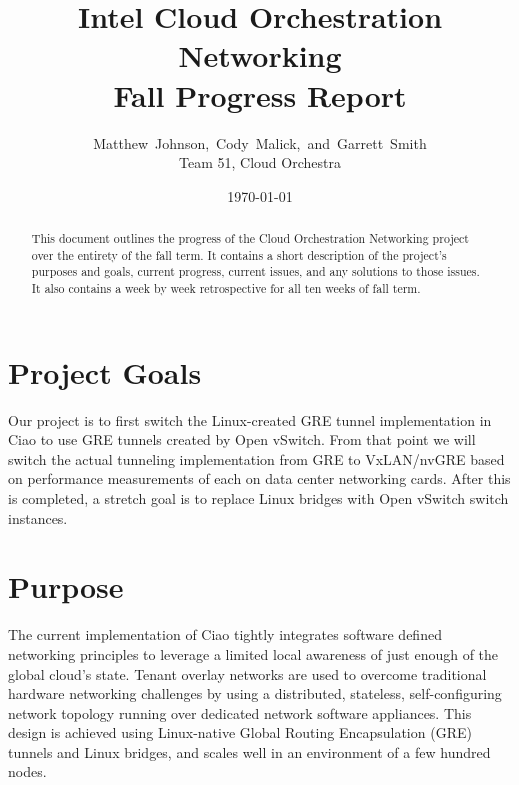 \documentclass[10pt,onecolumn,journal,draftclsnofoot]{IEEEtran}
\begin{document}
\begin{titlepage}
	\title{Intel Cloud Orchestration Networking\\ Fall Progress Report}
	\author{Matthew~Johnson,~Cody~Malick,~and~Garrett~Smith\\
		Team 51, Cloud Orchestra}
	\date{\today}
	\maketitle
	\vspace{4cm}
	\begin{abstract}
		\noindent This document outlines the progress of the Cloud
		Orchestration Networking project over the entirety of the fall
		term. It contains a short description of the project's purposes
		and goals, current progress, current issues, and any solutions
		to those issues. It also contains a week by week retrospective
		for all ten weeks of fall term. \end{abstract}

\end{titlepage}
\tableofcontents
\clearpage

\section{Project Goals}

Our project is to first switch the Linux-created GRE tunnel implementation in
Ciao to use GRE tunnels created by Open vSwitch. From that point we will switch
the actual tunneling implementation from GRE to VxLAN/nvGRE based on performance
measurements of each on data center networking cards. After this is completed, a
stretch goal is to replace Linux bridges with Open vSwitch switch instances.

\section{Purpose}

The current implementation of Ciao tightly integrates software defined
networking principles to leverage a limited local awareness of just enough of
the global cloud's state. Tenant overlay networks are used to overcome
traditional hardware networking challenges by using a distributed, stateless,
self-configuring network topology running over dedicated network software
appliances. This design is achieved using Linux-native Global Routing
Encapsulation (GRE) tunnels and Linux bridges, and scales well in an environment
of a few hundred nodes.
\end{document}
